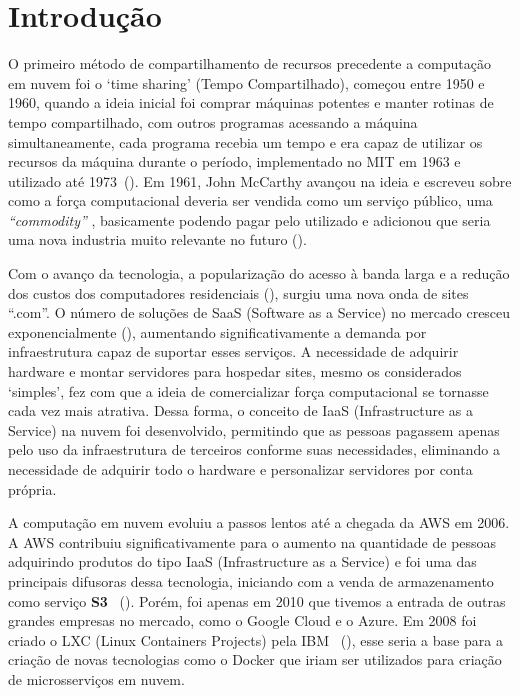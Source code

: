 \chapter{Introdução}
\label{chp:introduction}

O primeiro método de compartilhamento de recursos precedente a computação em nuvem foi o `time sharing' (Tempo Compartilhado), começou entre 1950 e 1960, quando a ideia inicial foi comprar máquinas potentes e manter rotinas de tempo compartilhado, com outros programas acessando a máquina simultaneamente, cada programa recebia um tempo e era capaz de utilizar os recursos da máquina durante o período, implementado no MIT em 1963 e utilizado até 1973~(\cite{HistoryOfCloudByIBM}). Em 1961, John McCarthy avançou na ideia e escreveu sobre como a força computacional deveria ser vendida como um serviço público, uma \textit{``commodity''} \cite[History Cloud]{arutyunov2012cloud}, basicamente podendo pagar pelo utilizado e adicionou que seria uma nova industria muito relevante no futuro (\cite{qian2009cloud}).

Com o avanço da tecnologia, a popularização do acesso à banda larga e a redução dos custos dos computadores residenciais (\cite{qian2009cloud}), surgiu uma nova onda de sites ``.com''. O número de soluções de SaaS (Software as a Service) no mercado cresceu exponencialmente (\cite{InternetLiveWebsites}), aumentando significativamente a demanda por infraestrutura capaz de suportar esses serviços. A necessidade de adquirir hardware e montar servidores para hospedar sites, mesmo os considerados `simples', fez com que a ideia de comercializar força computacional se tornasse cada vez mais atrativa. Dessa forma, o conceito de IaaS (Infrastructure as a Service) na nuvem foi desenvolvido, permitindo que as pessoas pagassem apenas pelo uso da infraestrutura de terceiros conforme suas necessidades, eliminando a necessidade de adquirir todo o hardware e personalizar servidores por conta própria.

A computação em nuvem evoluiu a passos lentos até a chegada da AWS em 2006. A AWS contribuiu significativamente para o aumento na quantidade de pessoas adquirindo produtos do tipo IaaS (Infrastructure as a Service) e foi uma das principais difusoras dessa tecnologia, iniciando com a venda de armazenamento como serviço \textbf{S3} ~(\cite{AWSlauch}). Porém, foi apenas em 2010 que tivemos a entrada de outras grandes empresas no mercado, como o Google Cloud e o Azure. Em 2008 foi criado o LXC (Linux Containers Projects) pela IBM ~(\cite{HistoryOfContainers}), esse seria a base para a criação de novas tecnologias como o Docker que iriam ser utilizados para criação de microsserviços em nuvem. 

